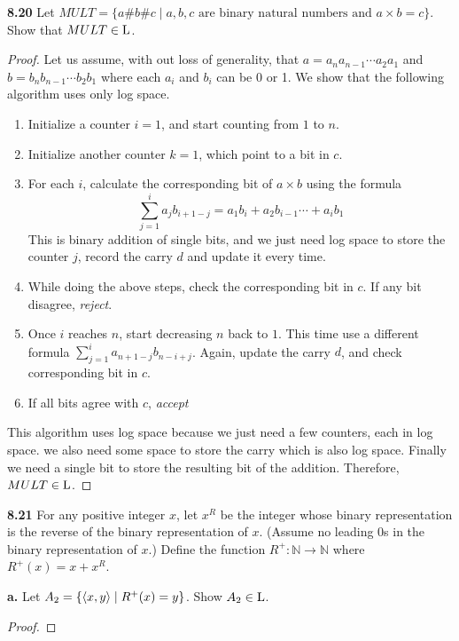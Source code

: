 \label{lang:MULT_L}
\textbf{8.20} Let $MULT = \{ a\#b\# c \mid a, b, c \text{ are binary natural numbers and } a \times b = c \}$. Show that $MULT \in \text{L}$.
\begin{mdframed}
\begin{proof}
Let us assume, with out loss of generality, that $a = a_n a_{n-1} \cdots a_2 a_1$ and $b = b_n b_{n-1} \cdots b_2 b_1$ where each $a_i$ and $b_i$ can be 0 or 1. We show that the following algorithm uses only log space. 

\begin{enumerate}
\item Initialize a counter $i=1$, and start counting from $1$ to $n$.
\item Initialize another counter $k=1$, which point to a bit in $c$.
\item For each $i$, calculate the corresponding bit of $a\times b$ using the formula 
\[\sum_{j=1}^i a_j b_{i+1-j} = a_1 b_{i} + a_2 b_{i-1} \cdots + a_i b_1\]
This is binary addition of single bits, and we just need log space to store the counter $j$, record the carry $d$ and update it every time.
\item While doing the above steps, check the corresponding bit in $c$. If any bit disagree, \textit{reject}.
\item Once $i$ reaches $n$, start decreasing $n$ back to $1$. This time use a different formula $\sum_{j=1}^i a_{n+1-j} b_{n-i+j}$. Again, update the carry $d$, and check corresponding bit in $c$.
\item If all bits agree with $c$, \textit{accept}
\end{enumerate}

This algorithm uses log space because we just need a few counters, each  in log space. we also need some space to store the carry which is also log space. Finally we need a single bit to store the resulting bit of the addition. Therefore, $MULT \in \text{L}$.
\end{proof}
\end{mdframed}

\textbf{8.21} For any positive integer $x$, let $x^R$ be the integer whose binary representation is the reverse of the binary representation of $x$. (Assume no leading 0s in the binary representation of $x$.) Define the function $R^+: \mathbb{N} \rightarrow \mathbb{N}$ where $R^+(x) = x + x^R$.

\textbf{a.} Let $A_2 = \{ \langle{x,y}\rangle \mid R^+(x) = y \}$. Show $A_2 \in \text{L}$.
\begin{mdframed}
\begin{proof}

\end{proof}
\end{mdframed}

